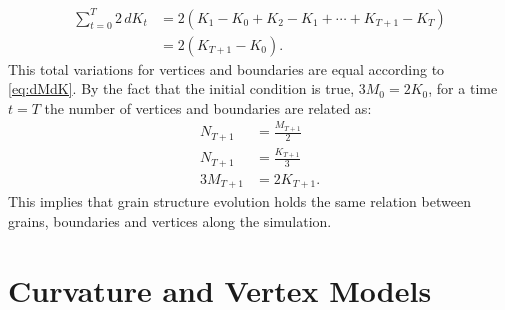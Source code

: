 \begin{align*}
    \sum_{t=0}^{T}2\,dK_t &= 2(K_1 - K_0 + K_2 - K_1 + \cdots + K_{T+1} - K_T) \\
    &= 2(K_{T+1} - K_0).
\end{align*}
This total variations for vertices and boundaries are equal according to \eqref{eq:dMdK}. By the fact that the initial condition is true, \ie  $3M_0 = 2K_0$, for a time $t=T$ the number of vertices and boundaries are related as:
\begin{align*}
    N_{T+1} &= \frac{M_{T+1}}{2}\\
    N_{T+1} &= \frac{K_{T+1}}{3}\\
    3M_{T+1} &= 2K_{T+1}.
\end{align*}
This implies that grain structure evolution holds the same relation between grains, boundaries and vertices along the simulation.
\section{Curvature and Vertex Models}


